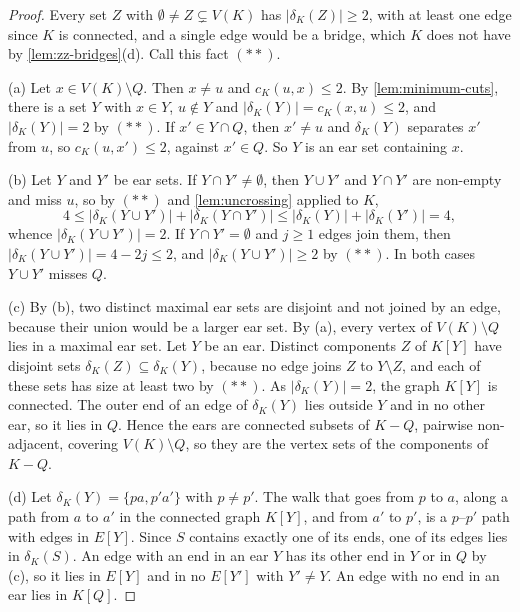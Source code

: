 \begin{proof}
Every set $Z$ with $\emptyset \neq Z \subsetneq V(K)$ has $|\delta_K(Z)| \geq 2$, with at least one edge since $K$ is connected, and a single edge would be a bridge, which $K$ does not have by \cref{lem:zz-bridges}(d).
Call this fact $(**)$.

(a) Let $x \in V(K) \setminus Q$.
Then $x \neq u$ and $c_K(u, x) \leq 2$.
By \cref{lem:minimum-cuts}, there is a set $Y$ with $x \in Y$, $u \notin Y$ and $|\delta_K(Y)| = c_K(x, u) \leq 2$, and $|\delta_K(Y)| = 2$ by $(**)$.
If $x' \in Y \cap Q$, then $x' \neq u$ and $\delta_K(Y)$ separates $x'$ from $u$, so $c_K(u, x') \leq 2$, against $x' \in Q$.
So $Y$ is an ear set containing $x$.

(b) Let $Y$ and $Y'$ be ear sets.
If $Y \cap Y' \neq \emptyset$, then $Y \cup Y'$ and $Y \cap Y'$ are non-empty and miss $u$, so by $(**)$ and \cref{lem:uncrossing} applied to $K$,
\[
4 \leq |\delta_K(Y \cup Y')| + |\delta_K(Y \cap Y')| \leq |\delta_K(Y)| + |\delta_K(Y')| = 4,
\]
whence $|\delta_K(Y \cup Y')| = 2$.
If $Y \cap Y' = \emptyset$ and $j \geq 1$ edges join them, then $|\delta_K(Y \cup Y')| = 4 - 2j \leq 2$, and $|\delta_K(Y \cup Y')| \geq 2$ by $(**)$.
In both cases $Y \cup Y'$ misses $Q$.

(c) By (b), two distinct maximal ear sets are disjoint and not joined by an edge, because their union would be a larger ear set.
By (a), every vertex of $V(K) \setminus Q$ lies in a maximal ear set.
Let $Y$ be an ear.
Distinct components $Z$ of $K[Y]$ have disjoint sets $\delta_K(Z) \subseteq \delta_K(Y)$, because no edge joins $Z$ to $Y \setminus Z$, and each of these sets has size at least two by $(**)$.
As $|\delta_K(Y)| = 2$, the graph $K[Y]$ is connected.
The outer end of an edge of $\delta_K(Y)$ lies outside $Y$ and in no other ear, so it lies in $Q$.
Hence the ears are connected subsets of $K - Q$, pairwise non-adjacent, covering $V(K) \setminus Q$, so they are the vertex sets of the components of $K - Q$.

(d) Let $\delta_K(Y) = \{pa, p'a'\}$ with $p \neq p'$.
The walk that goes from $p$ to $a$, along a path from $a$ to $a'$ in the connected graph $K[Y]$, and from $a'$ to $p'$, is a $p$--$p'$ path with edges in $E[Y]$.
Since $S$ contains exactly one of its ends, one of its edges lies in $\delta_K(S)$.
An edge with an end in an ear $Y$ has its other end in $Y$ or in $Q$ by (c), so it lies in $E[Y]$ and in no $E[Y']$ with $Y' \neq Y$.
An edge with no end in an ear lies in $K[Q]$.
\end{proof}

